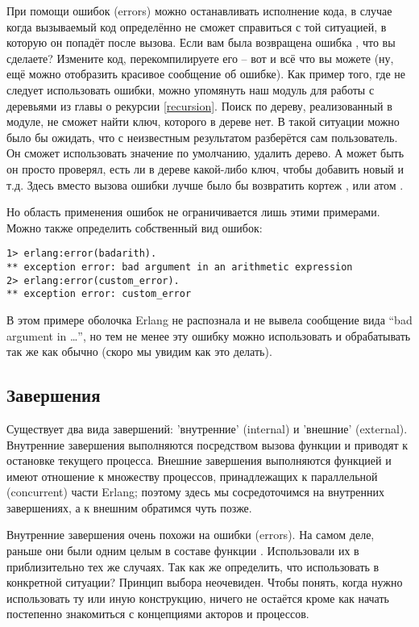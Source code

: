 При помощи ошибок (errors) можно останавливать исполнение кода, в случае когда вызываемый код определённо не сможет справиться с той ситуацией, в которую он попадёт после вызова.
Если вам была возвращена ошибка , что вы сделаете?
Измените код, перекомпилируете его \--- вот и всё что вы можете (ну, ещё можно отобразить красивое сообщение об ошибке).
Как пример того, где не следует использовать ошибки, можно упомянуть наш модуль для работы с деревьями из главы о рекурсии \ref{recursion}.
Поиск по дереву, реализованный в модуле, не сможет найти ключ, которого в дереве нет.
В такой ситуации можно было бы ожидать, что с неизвестным результатом разберётся сам пользователь. 
Он сможет использовать значение по умолчанию, удалить дерево.
А может быть он просто проверял, есть ли в дереве какой\--либо ключ, чтобы добавить новый и т.д.
Здесь вместо вызова ошибки лучше было бы возвратить кортеж , или атом .

Но область применения ошибок не ограничивается лишь этими примерами.
Можно также определить собственный вид ошибок:
\begin{lstlisting}[style=erlang]
1> erlang:error(badarith).
** exception error: bad argument in an arithmetic expression
2> erlang:error(custom_error).
** exception error: custom_error
\end{lstlisting}

В этом примере оболочка Erlang не распознала  и не вывела сообщение вида ``bad argument in \ldots'', но тем не менее эту ошибку можно использовать и обрабатывать так же как обычно (скоро мы увидим как это делать).

\subsection{Завершения}
\label{exits}
Существует два вида завершений: 'внутренние' (internal) и 'внешние' (external).
Внутренние завершения выполняются посредством вызова функции  и приводят к остановке текущего процесса.
Внешние завершения выполняются функцией  и имеют отношение к множеству процессов, принадлежащих к параллельной (concurrent) части Erlang; поэтому здесь мы сосредоточимся на внутренних завершениях, а к внешним обратимся чуть позже.

Внутренние завершения очень похожи на ошибки (errors).
На самом деле, раньше они были одним целым в составе функции .
Использовали их в приблизительно тех же случаях.
Так как же определить, что использовать в конкретной ситуации?
Принцип выбора неочевиден.
Чтобы понять, когда нужно использовать ту или иную конструкцию, ничего не остаётся кроме как начать постепенно знакомиться с концепциями акторов и процессов.

